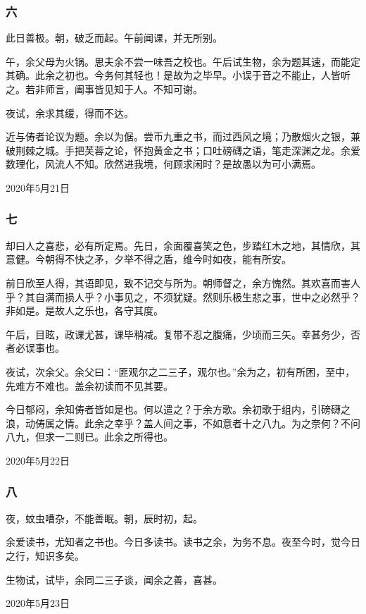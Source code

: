 \documentclass[a5paper]{ctexart}
\begin{document}
	\subsubsection{六}
	此日善极。朝，破乏而起。午前闻课，并无所别。
	
	午，余父母为火锅。思夫余不尝一味吾之校也。午后试生物，余为题其速，而能定其确。此余之初也。今务何其轻也！是故为之毕早。小误于音之不能止，人皆听之。若非师言，阖事皆见知于人。不知可谢。
	
	夜试，余求其缓，得而不达。
	
	近与俦者论议为题。余以为倨。尝币九重之书，而过西风之境；乃散烟火之银，兼破荆棘之城。手把芙蓉之论，怀抱黄金之书；口吐磅礴之语，笔走深渊之龙。余爱数理化，风流人不知。欣然进我境，何顾求闲时？是故愚以为可小满焉。
	\begin{flushright}
		2020年5月21日
	\end{flushright}
	
	\subsubsection{七}
	却曰人之喜悲，必有所定焉。先日，余面覆喜笑之色，步踏红木之地，其情欣，其意健。今朝得不快之矛，夕举不得之盾，维今时如夜，能有所安。
	
	前日欣至人得，其语即见，致不记交与所为。朝师督之，余方愧然。其欢喜而害人乎？其自满而损人乎？小事见之，不须犹疑。然则乐极生悲之事，世中之必然乎？非如是。是故人之乐也，各守其度。
	
	午后，目眩，政课尤甚，课毕稍减。复带不忍之腹痛，少顷而三矢。幸甚务少，否者必误事也。
	
	夜试，次余父。余父曰：“匪观尔之二三子，观尔也。”余为之，初有所困，至中，先难方不难也。盖余初读而不见其要。
	
	今日郁闷，余知俦者皆如是也。何以遣之？于余方歌。余初歌于组内，引磅礴之浪，动俦属之情。此余之幸乎？盖人间之事，不如意者十之八九。为之奈何？不问八九，但求一二则已。此余之所得也。
	\begin{flushright}
		2020年5月22日
	\end{flushright}
	
	\subsubsection{八}
	夜，蚊虫嘈杂，不能善眠。朝，辰时初，起。
	
	余爱读书，尤知者之书也。今日多读书。读书之余，为务不息。夜至今时，觉今日之行，知识多矣。
	
	生物试，试毕，余同二三子谈，闻余之善，喜甚。
	\begin{flushright}
		2020年5月23日
	\end{flushright}
	
\end{document}
